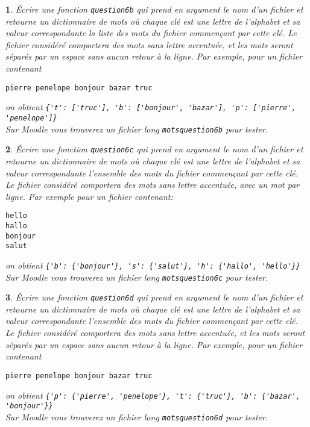 \documentclass[10pt]{article}
\newtheorem{exi}{}
\newenvironment{exo}{\begin{exi}\em}{\end{exi}}
\begin{document}
\vspace*{-2ex}
\begin{exo}
    Écrire une fonction \verb+question6b+ qui prend en argument le nom d'un fichier
et retourne un dictionnaire de mots où chaque clé est une lettre de
l'alphabet et sa valeur correspondante la liste des mots du fichier commençant
par cette clé. Le fichier considéré comportera des mots sans lettre accentuée, et les mots seront séparés par un espace sans aucun retour
à la ligne.
Par exemple, pour un fichier contenant
\begin{verbatim}
pierre penelope bonjour bazar truc
\end{verbatim}
on obtient \verb+{'t': ['truc'], 'b': ['bonjour', 'bazar'], 'p': ['pierre', 'penelope']}+\\
Sur Moodle vous trouverez un fichier long \verb+motsquestion6b+ pour tester.
\end{exo}
\vspace*{-2ex}
\begin{exo}
    Écrire une fonction \verb+question6c+ qui prend en argument le nom d'un fichier
et retourne un dictionnaire de mots où chaque clé est une lettre de
l'alphabet et sa valeur correspondante l'ensemble des mots du fichier commençant
par cette clé. Le fichier considéré comportera des mots 
sans lettre accentuée, avec un mot par ligne. Par exemple pour un fichier
contenant:
\begin{verbatim}
hello
hallo
bonjour
salut
\end{verbatim}
on obtient \verb+{'b': {'bonjour'}, 's': {'salut'}, 'h': {'hallo', 'hello'}}+\\
Sur Moodle vous trouverez un fichier long \verb+motsquestion6c+ pour tester.
\end{exo}
\vspace*{-2ex}
\begin{exo}
    Écrire une fonction \verb+question6d+ qui prend en argument le nom d'un fichier
et retourne un dictionnaire de mots où chaque clé est une lettre de
l'alphabet et sa valeur correspondante l'ensemble des mots du fichier commençant
par cette clé. Le fichier considéré comportera des mots sans lettre accentuée, et les mots seront séparés par un espace sans aucun retour
à la ligne.
Par exemple, pour un fichier contenant
\begin{verbatim}
pierre penelope bonjour bazar truc
\end{verbatim}
on obtient \verb+{'p': {'pierre', 'penelope'}, 't': {'truc'}, 'b': {'bazar', 'bonjour'}}+\\
Sur Moodle vous trouverez un fichier long \verb+motsquestion6d+ pour tester.
\end{exo}
\end{document}
